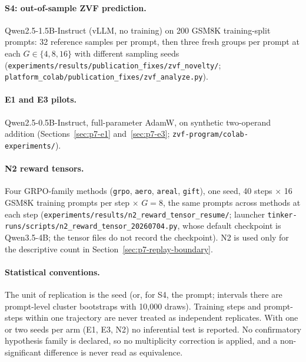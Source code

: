 \paragraph{S4: out-of-sample ZVF prediction.} Qwen2.5-1.5B-Instruct (vLLM, no
training) on 200 GSM8K training-split prompts: 32 reference samples per prompt,
then three fresh groups per prompt at each $G\in\{4,8,16\}$ with different
sampling seeds
(\texttt{experiments/results/publication\_fixes/zvf\_novelty/};
\texttt{platform\_colab/publication\_fixes/zvf\_analyze.py}).

\paragraph{E1 and E3 pilots.} Qwen2.5-0.5B-Instruct, full-parameter AdamW, on
synthetic two-operand addition (Sections~\ref{sec:p7-e1}
and~\ref{sec:p7-e3}; \texttt{zvf-program/colab-experiments/}).

\paragraph{N2 reward tensors.} Four GRPO-family methods (\texttt{grpo},
\texttt{aero}, \texttt{areal}, \texttt{gift}), one seed, 40 steps $\times$ 16
GSM8K training prompts per step $\times$ $G{=}8$, the same prompts across
methods at each step (\texttt{experiments/results/n2\_reward\_tensor\_resume/};
launcher \texttt{tinker-runs/scripts/n2\_reward\_tensor\_20260704.py}, whose
default checkpoint is Qwen3.5-4B; the tensor files do not record the
checkpoint). N2 is used only for the descriptive count in
Section~\ref{sec:p7-replay-boundary}.

\paragraph{Statistical conventions.} The unit of replication is the seed (or,
for S4, the prompt; intervals there are prompt-level cluster bootstraps with
10{,}000 draws). Training steps and prompt-steps within one trajectory are
never treated as independent replicates. With one or two seeds per arm (E1,
E3, N2) no inferential test is reported. No confirmatory hypothesis family is
declared, so no multiplicity correction is applied, and a non-significant
difference is never read as equivalence.
